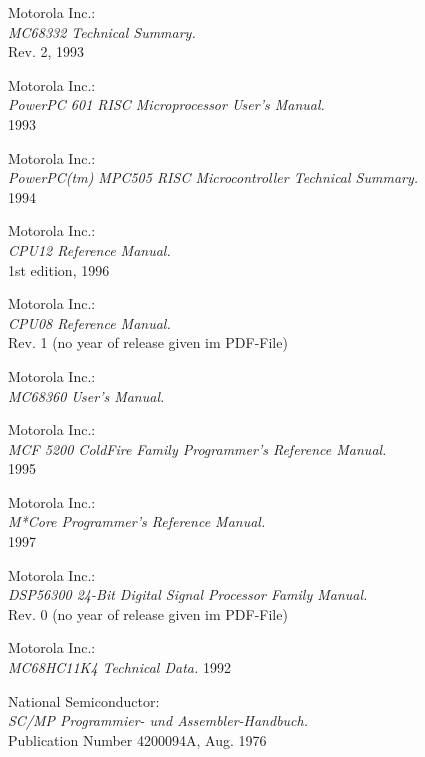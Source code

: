 \documentclass[12pt,twoside]{report}
\begin{document}
\begin{thebibliography}{99}
 Motorola Inc.: \\
                 {\em MC68332 Technical Summary.\/} \\
                 Rev. 2, 1993

 Motorola Inc.: \\
                 {\em PowerPC 601 RISC Microprocessor User's Manual.\/} \\
                 1993

 Motorola Inc.: \\
                 {\em PowerPC(tm) MPC505 RISC Microcontroller Technical
                 Summary.\/} \\
        	 1994

 Motorola Inc.: \\
                {\em CPU12 Reference Manual.\/} \\
                1st edition, 1996

 Motorola Inc.: \\
                {\em CPU08 Reference Manual.\/} \\
                Rev. 1 (no year of release given im PDF-File)

 Motorola Inc.: \\
                 {\em MC68360 User's Manual.\/}

 Motorola Inc.: \\
                  {\em MCF 5200 ColdFire Family Programmer's Reference
                   Manual.\/} \\
                  1995

 Motorola Inc.: \\
                   {\em M*Core Programmer's Reference Manual.\/} \\
                   1997

 Motorola Inc.: \\
                   {\em DSP56300 24-Bit Digital Signal Processor
                    Family Manual.\/} \\
                   Rev. 0 (no year of release given im PDF-File)

 Motorola Inc.: \\
                {\em MC68HC11K4 Technical Data.\/}
                1992

 National Semiconductor: \\
               {\em SC/MP Program\-mier- und
                As\-sem\-bler-Hand\-buch.\/} \\
               Publication Number 4200094A, Aug. 1976


\end{thebibliography}
\end{document}
